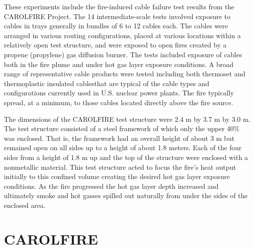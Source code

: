 \documentclass[11pt]{book}
\begin{document}

These experiments include the fire-induced cable failure test results
from the CAROLFIRE Project. The 14 intermediate-scale tests involved
exposure to cables in trays generally in bundles of 6 to 12 cables each. The
cables were arranged in various routing configurations, placed at various
locations within a relatively open test structure, and were exposed to
open fires created by a propene (propylene) gas diffusion burner. The 
tests included exposure of cables both in the fire plume and under
hot gas layer exposure conditions. A broad range of representative
cable products were tested including both thermoset and thermoplastic 
insulated cablesthat are typical of the cable types and configurations
currently used in U.S. nuclear power plants. The fire typically spread,
at a minimum, to those cables located directly above the fire source.

The dimensions of the CAROLFIRE test structure were
2.4 m by 3.7 m by 3.0 m. The test structure consisted of
a steel framework of which only the upper 40\% was enclosed.
That is, the framework had an overall height of about 3 m
but remained open on all sides up to a height of about 1.8 meters.
Each of the four sides from a height of 1.8 m up and
the top of the structure were enclosed with a nonmetallic
material. This test structure acted to focus the fire's heat output
initially to this confined volume creating the desired hot gas layer
exposure conditions. As the fire progressed the hot gas layer depth
increased and ultimately smoke and hot gasses spilled out naturally 
from under the sides of the enclosed area.






\clearpage


\section{CAROLFIRE}
\end{document}
